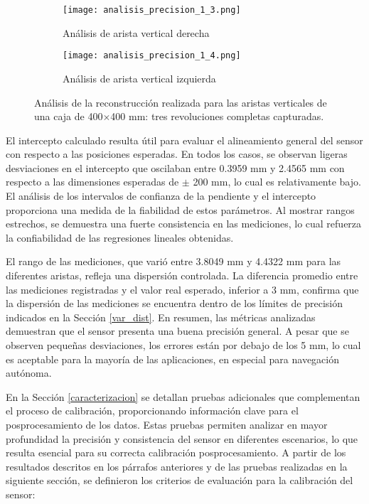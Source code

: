 \begin{figure}[H]
	\centering
	\begin{subfigure}{0.45\textwidth}
		\centering
		\texttt{[image: analisis\_precision\_1\_3.png]}
		\caption{Análisis de arista vertical derecha}
		\label{analisis_precision_1_3}
	\end{subfigure}
	\hspace{1em}
	\begin{subfigure}{0.45\textwidth}
		\centering
		\texttt{[image: analisis\_precision\_1\_4.png]}
		\caption{Análisis de arista vertical izquierda}
		\label{analisis_precision_1_4}
	\end{subfigure}
	\caption{Análisis de la reconstrucción realizada para las aristas verticales de una caja de 400$\times$400 mm: tres revoluciones completas capturadas.}
	\label{fig: reconstruccion_analisis_vertical_1}
\end{figure}

El intercepto calculado resulta útil para evaluar el alineamiento general del sensor con respecto a las posiciones esperadas. En todos los casos, se observan ligeras desviaciones en el intercepto que oscilaban entre 0.3959 mm y 2.4565 mm con respecto a las dimensiones esperadas de $\pm$ 200 mm, lo cual es relativamente bajo. El análisis de los intervalos de confianza de la pendiente y el intercepto proporciona una medida de la fiabilidad de estos parámetros. Al mostrar rangos estrechos, se demuestra una fuerte consistencia en las mediciones, lo cual refuerza la confiabilidad de las regresiones lineales obtenidas. 

El rango de las mediciones, que varió entre 3.8049 mm y 4.4322 mm para las diferentes aristas, refleja una dispersión controlada. La diferencia promedio entre las mediciones registradas y el valor real esperado, inferior a 3 mm, confirma que la dispersión de las mediciones se encuentra dentro de los límites de precisión indicados en la Sección \ref{var_dist}. En resumen, las métricas analizadas demuestran que el sensor presenta una buena precisión general. A pesar que se observen pequeñas desviaciones, los errores están por debajo de los 5 mm, lo cual es aceptable para la mayoría de las aplicaciones, en especial para navegación autónoma.

En la Sección \ref{caracterizacion} se detallan pruebas adicionales que complementan el proceso de calibración, proporcionando información clave para el posprocesamiento de los datos. Estas pruebas permiten analizar en mayor profundidad la precisión y consistencia del sensor en diferentes escenarios, lo que resulta esencial para su correcta calibración posprocesamiento. A partir de los resultados descritos en los párrafos anteriores y de las pruebas realizadas en la siguiente sección, se definieron los criterios de evaluación para la calibración del sensor:

